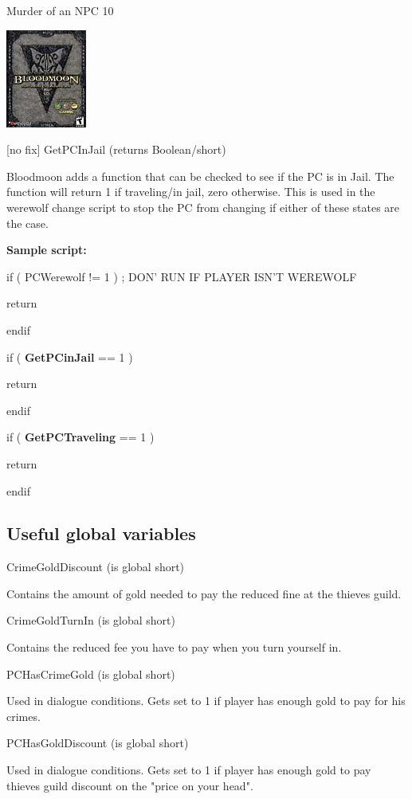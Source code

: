 Murder of an NPC 10

\includegraphics{media/image7.png}

{[}no fix{]} GetPCInJail (returns Boolean/short)

Bloodmoon adds a function that can be checked to see if the PC is in
Jail. The function will return 1 if traveling/in jail, zero otherwise.
This is used in the werewolf change script to stop the PC from changing
if either of these states are the case.

\textbf{Sample script:}

if ( PCWerewolf != 1 ) ; DON' RUN IF PLAYER ISN'T WEREWOLF

return

endif

if ( \textbf{GetPCinJail} == 1 )

return

endif

if ( \textbf{GetPCTraveling} == 1 )

return

endif

\hypertarget{useful-global-variables}{%
\subsection{\texorpdfstring{\hfill\break
Useful global
variables}{ Useful global variables}}\label{useful-global-variables}}

CrimeGoldDiscount (is global short)

Contains the amount of gold needed to pay the reduced fine at the
thieves guild.

CrimeGoldTurnIn (is global short)

Contains the reduced fee you have to pay when you turn yourself in.

PCHasCrimeGold (is global short)

Used in dialogue conditions. Gets set to 1 if player has enough gold to
pay for his crimes.

PCHasGoldDiscount (is global short)

Used in dialogue conditions. Gets set to 1 if player has enough gold to
pay thieves guild discount on the "price on your head".

